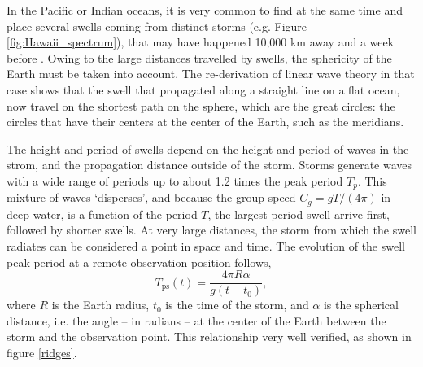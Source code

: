 In the Pacific or Indian oceans, it is very common to find at the same time and place 
 several swells coming from distinct storms (e.g. Figure \ref{fig:Hawaii_spectrum}), that may have happened 10,000 km away and a week before \citep{Darbyshire1957, Munk&al.1963}. 
Owing to the large distances travelled by swells, the sphericity of the Earth must be taken into account. The re-derivation of linear wave theory in that case 
shows that the swell that propagated along a straight line on a flat ocean, now travel on the shortest path on the sphere, which are the great circles:  
the circles that have their centers at the center of the Earth, such as the meridians. 

The height and period of swells depend on the height and period of waves in the strom, and the propagation distance outside of the storm. Storms generate waves with a wide range of periods up to about 1.2 times the peak period $T_p$. This mixture of waves `disperses', and because the group speed $C_g=g T/(4 \pi)$  in deep water, is a function of the period $T$, 
the largest period swell arrive first, followed by shorter swells. 
At very large distances, the storm from which the swell radiates can be considered a point in 
space and time. The evolution of the swell peak period at a remote observation position follows, 
\begin{equation}
T_{\mathrm{ps}} (t) = \frac{4\pi R \alpha }{g(t-t_0)},
\label{prev lin1}
\end{equation}
where $R$ is the Earth radius, $t_0$ is the time of the storm, and $\alpha$ is the spherical distance, i.e. the angle -- in radians -- at the center of the Earth between the storm and the observation point. This relationship very well verified, as shown in figure \ref{ridges}.


